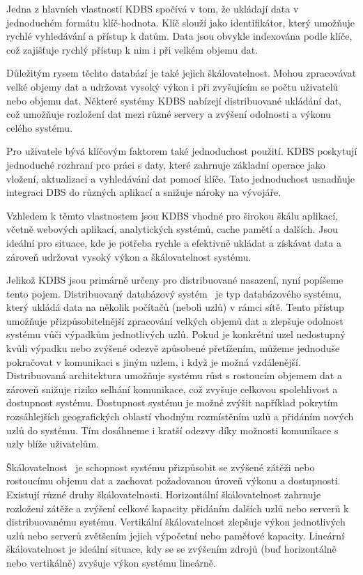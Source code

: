 \documentclass[czech,master,dept460,male,csharp,cpdeclaration]{diploma}
\begin{document}
	Jedna z hlavních vlastností KDBS spočívá v tom, že ukládají data v jednoduchém formátu klíč-hodnota. Klíč slouží jako identifikátor, který umožňuje rychlé vyhledávání a přístup k datům. Data jsou obvykle indexována podle klíče, což zajišťuje rychlý přístup k nim i při velkém objemu dat.
	
	Důležitým rysem těchto databází je také jejich škálovatelnost. Mohou zpracovávat velké objemy dat a udržovat vysoký výkon i při zvyšujícím se počtu uživatelů nebo objemu dat. Některé systémy KDBS nabízejí distribuované ukládání dat, což umožňuje rozložení dat mezi různé servery a zvýšení odolnosti a výkonu celého systému.
	
	Pro uživatele bývá klíčovým faktorem také jednoduchost použití. KDBS poskytují jednoduché rozhraní pro práci s daty, které zahrnuje základní operace jako vložení, aktualizaci a vyhledávání dat pomocí klíče. Tato jednoduchost usnadňuje integraci DBS do různých aplikací a snižuje nároky na vývojáře.
	
	Vzhledem k těmto vlastnostem jsou KDBS vhodné pro širokou škálu aplikací, včetně webových aplikací, analytických systémů, cache pamětí a dalších. Jsou ideální pro situace, kde je potřeba rychle a efektivně ukládat a získávat data a zároveň udržovat vysoký výkon a škálovatelnost systému.
	
	Jelikož KDBS jsou primárně určeny pro distribuované nasazení, nyní popíšeme tento pojem. Distribuovaný databázový systém~\cite{ddbs} je typ databázového systému, který ukládá data na několik počítačů (neboli uzlů) v rámci sítě. Tento přístup umožňuje přizpůsobitelnější zpracování velkých objemů dat a zlepšuje odolnost systému vůči výpadkům jednotlivých uzlů. Pokud je konkrétní uzel nedostupný kvůli výpadku nebo zvýšené odezvě způsobené přetížením, můžeme jednoduše pokračovat v komunikaci s jiným uzlem, i když je možná vzdálenější. Distribuovaná architektura umožňuje systému růst s rostoucím objemem dat a zároveň snižuje riziko selhání komunikace, což zvyšuje celkovou spolehlivost a dostupnost systému. Dostupnost systému je možné zvýšit například pokrytím rozsáhlejších geografických oblastí vhodným rozmístěním uzlů a přidáním nových uzlů do systému. Tím dosáhneme i kratší odezvy díky možnosti komunikace s uzly blíže uživatelům.
	
	Škálovatelnost~\cite{scalability}\label{scaling-dbs} je schopnost systému přizpůsobit se zvýšené zátěži nebo rostoucímu objemu dat a zachovat požadovanou úroveň výkonu a dostupnosti. Existují různé druhy škálovatelnosti. Horizontální škálovatelnost zahrnuje rozložení zátěže a zvýšení celkové kapacity přidáním dalších uzlů nebo serverů k distribuovanému systému. Vertikální škálovatelnost zlepšuje výkon jednotlivých uzlů nebo serverů zvětšením jejich výpočetní nebo paměťové kapacity. Lineární škálovatelnost je ideální situace, kdy se se zvýšením zdrojů (buď horizontálně nebo vertikálně) zvyšuje výkon systému lineárně.
	
\end{document}
